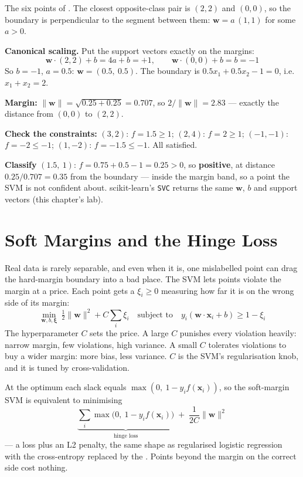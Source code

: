 \begin{worked}
The six points of . The closest opposite-class pair is $(2,2)$ and
$(0,0)$, so the boundary is perpendicular to the segment between them:
$\mathbf{w} = a\,(1, 1)$ for some $a > 0$.

\smallskip
\textbf{Canonical scaling.} Put the support vectors exactly on the margins:
\[
\mathbf{w}\cdot(2,2) + b = 4a + b = +1, \qquad \mathbf{w}\cdot(0,0) + b = b = -1
\]
So $b = -1$, $a = 0.5$: $\mathbf{w} = (0.5,\ 0.5)$. The boundary is
$0.5x_1 + 0.5x_2 - 1 = 0$, i.e.\ $x_1 + x_2 = 2$.

\textbf{Margin:} $\|\mathbf{w}\| = \sqrt{0.25 + 0.25} = 0.707$, so
$2/\|\mathbf{w}\| = \mathbf{2.83}$ --- exactly the distance from $(0,0)$ to $(2,2)$.

\textbf{Check the constraints:} $(3,2)$: $f = 1.5 \ge 1$; $(2,4)$: $f = 2 \ge 1$;
$(-1,-1)$: $f = -2 \le -1$; $(1,-2)$: $f = -1.5 \le -1$. All satisfied.

\smallskip
\textbf{Classify} $(1.5,\ 1)$: $f = 0.75 + 0.5 - 1 = 0.25 > 0$, so \textbf{positive}, at
distance $0.25/0.707 = 0.35$ from the boundary --- inside the margin band, so a
point the SVM is not confident about. scikit-learn's \texttt{SVC} returns the same
$\mathbf{w}$, $b$ and support vectors (this chapter's lab).
\end{worked}

\section{Soft Margins and the Hinge Loss}

Real data is rarely separable, and even when it is, one mislabelled point can drag
the hard-margin boundary into a bad place. The  SVM lets points
violate the margin at a price. Each point gets a 
$\xi_i \ge 0$ measuring how far it is on the wrong side of its margin:
\[
\min_{\mathbf{w}, b, \boldsymbol{\xi}}\ \tfrac{1}{2}\|\mathbf{w}\|^2 + C\sum_i \xi_i
\quad\text{subject to}\quad y_i(\mathbf{w}\cdot\mathbf{x}_i + b) \ge 1 - \xi_i
\]
The hyperparameter $C$ sets the price. A large $C$ punishes every violation
heavily: narrow margin, few violations, high variance. A small $C$ tolerates
violations to buy a wider margin: more bias, less variance. $C$ is the SVM's
regularisation knob, and it is tuned by cross-validation.

\begin{definitionbox}
At the optimum each slack equals $\max(0,\ 1 - y_i f(\mathbf{x}_i))$, so the soft-margin
SVM is equivalent to minimising
\[
\underbrace{\sum_i \max\big(0,\ 1 - y_i f(\mathbf{x}_i)\big)}_{\text{hinge loss}}
\;+\; \frac{1}{2C}\|\mathbf{w}\|^2
\]
--- a loss plus an L2 penalty, the same shape as regularised logistic regression
with the cross-entropy replaced by the . Points beyond the margin on the
correct side cost nothing.
\end{definitionbox}

